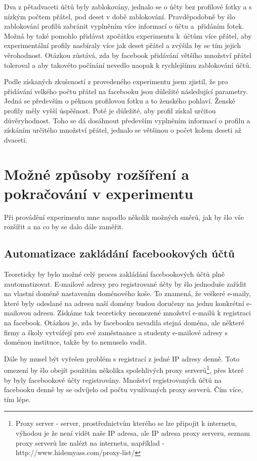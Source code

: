 \documentclass[thesis=M,czech]{FITthesis}[2013/05/10]
\begin{document}
Dva z pětadvaceti účtů byly zablokovány, jednalo se o účty bez profilové fotky a s nízkým počtem přátel, pod deset v době zablokování. Pravděpodobně by šlo zablokování profilů zabránit vyplněním více informací o účtu a~přidáním fotek. Možná by také pomohlo přidávat zpočátku experimentu k~účtům více přátel, aby experimentální profily nasbíraly více jak deset přátel a zvýšila by se tím jejich věrohodnost. Otázkou zůstává, zda by facebook přidávání většího množství přátel toleroval a aby takovéto počínání nevedlo naopak k rychlejšímu zablokování účtů.

Podle získaných zkušeností z provedeného experimentu jsem zjistil, že pro přidávání velkého počtu přátel na facebooku jsou důležité následující parametry. Jedná se především o pěknou profilovou fotku a to ženského pohlaví. Ženské profily měly vyšší úspěšnost. Poté je důležité, aby profil získal určitou důvěryhodnost. Toho se dá dosáhnout především vyplněním informací o profilu a získáním určitého množství přátel, jednalo se většinou o počet kolem deseti až dvaceti.


\section{Možné způsoby rozšíření a pokračování v experimentu}

Při provádění experimentu mne napadlo několik možných směrů, jak by šlo vše rozšířit a na co by se dalo dále zaměřit.

\subsection{Automatizace zakládání facebookových účtů}

Teoreticky by bylo možné celý proces zakládání facebookových účtů plně zautomatizovat. E-mailové adresy pro registrované účty by šlo jednoduše zařídit na vlastní doméně nastavením doménového koše. To znamená, že veškeré e-maily, které byly odeslané na adresu naší domény budou doručeny na jednu konkrétní e-mailovou adresu. Získáme tak teoreticky neomezené množství e-mailů k registraci na facebook. Otázkou je, zda by facebooku nevadila stejná doména, ale některé firmy a školy vytvářejí pro své zaměstnance a studenty e-mailové adresy s doménou instituce, takže by to nemuselo vadit.

Dále by musel být vyřešen problém s registrací z jedné IP adresy denně. Toto omezení by šlo obejít použitím několika spolehlivých proxy serverů\footnote{Proxy server - server, prostřednictvím kterého se lze připojit k internetu, výhodou je že není vidět naše IP adresa, ale IP adresa proxy serveru, seznam proxy serverů lze nalézt na internetu, například - http://www.hidemyass.com/proxy-list/}, přes které by byly facebookové účty registrovány. Množství registrovaných účtů na facebooku denně by se odvíjelo od počtu využívaných proxy serverů. Čím více, tím lépe.
\end{document}
